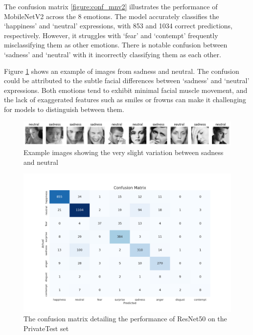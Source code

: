 The confusion matrix \ref{figure:conf_mnv2} illustrates the performance of MobileNetV2 across the 8 emotions. The model accurately classifies the `happiness' and `neutral' expressions, with 853 and 1034 correct predictions, respectively. However, it struggles with `fear' and `contempt' frequently misclassifying them as other emotions. There is notable confusion between `sadness' and `neutral' with it incorrectly classifying them as each other.

Figure \ref{figure:sadneutral} shows an example of images from sadness and neutral. The confusion could be attributed to the subtle facial differences between `sadness' and `neutral' expressions. Both emotions tend to exhibit minimal facial muscle movement, and the lack of exaggerated features such as smiles or frowns can make it challenging for models to distinguish between them.

\begin{figure}[H]
    \centering{}
    \includegraphics[scale=0.38]{fed_images/sadness+neutral.png}
    \caption{Example images showing the very slight variation between sadness and neutral}
    \label{figure:sadneutral}
\end{figure}

\begin{figure}[H]
    \centering{}
    \includegraphics[scale=0.38]{fed_images/conf_matrix_ResNet50.png}
    \caption{The confusion matrix detailing the performance of ResNet50 on the PrivateTest set}
    \label{figure:conf_rn50}
\end{figure}

